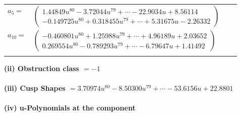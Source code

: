 \documentclass[1p]{elsarticle_modified}
\theoremstyle{definition}
\begin{document}
\begin{tabular}{m{7pt} m{180pt} m{7pt} m{180pt} }
\flushright $a_{5}=$&$\begin{pmatrix}1.44849 u^{80}-3.72044 u^{79}+\cdots-22.9034 u+8.56114\\-0.149725 u^{80}+0.318455 u^{79}+\cdots+5.31675 u-2.26332\end{pmatrix}$ \\
\flushright $a_{10}=$&$\begin{pmatrix}-0.460801 u^{80}+1.25988 u^{79}+\cdots+4.96189 u+2.03652\\0.269554 u^{80}-0.789293 u^{79}+\cdots-6.79647 u+1.41492\end{pmatrix}$\\&\end{tabular}
\flushleft \textbf{(ii) Obstruction class $= -1$}\\~\\
\flushleft \textbf{(iii) Cusp Shapes $= 3.70974 u^{80}-8.50300 u^{79}+\cdots-53.6156 u+22.8801$}\\~\\
\newpage\renewcommand{\arraystretch}{1}
\flushleft \textbf{(iv) u-Polynomials at the component}\newline \\
\end{document}
